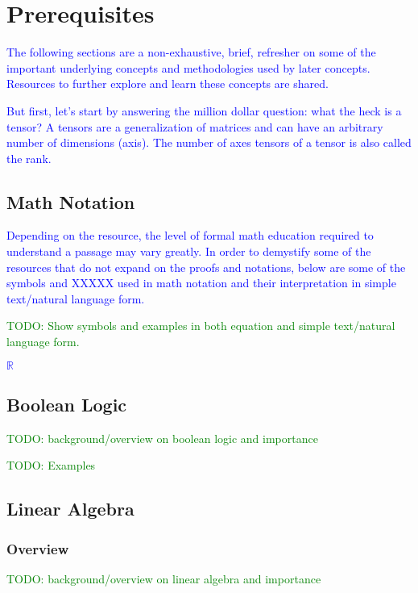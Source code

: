 \chapter{Prerequisites}

\textcolor{blue}{The following sections are a non-exhaustive, brief, refresher on some of the important underlying concepts and methodologies used by later concepts. Resources to further explore and learn these concepts are shared.}

\textcolor{blue}{But first, let's start by answering the million dollar question: what the heck is a tensor?  A {tensors} are a generalization of matrices and can have an arbitrary number of dimensions (axis). The number of axes tensors of a tensor is also called the {rank}.}


\section{Math Notation}

\textcolor{blue}{Depending on the resource, the level of formal math education required to understand a passage may vary greatly. In order to demystify some of the resources that do not expand on the proofs and notations, below are some of the symbols and XXXXX used in math notation and their interpretation in simple text/natural language form.}

\textcolor{green}{TODO: Show symbols and examples in both equation and simple text/natural language form.}

\textcolor{blue}{$\mathbb{R}$}


\section{Boolean Logic}

\textcolor{green}{TODO: background/overview on boolean logic and importance}

\textcolor{green}{TODO: Examples}


\section{Linear Algebra}

\subsection{Overview}

\textcolor{green}{TODO: background/overview on linear algebra and importance}

